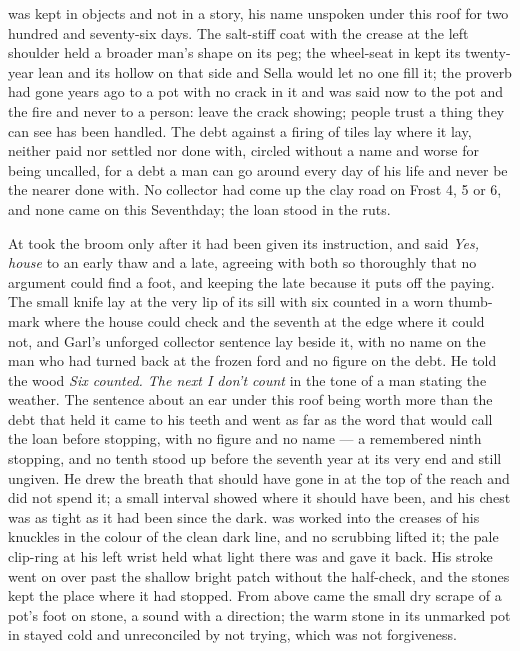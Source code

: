  was kept in objects and not in a story, his name unspoken under this roof for two hundred and seventy-six days. The salt-stiff coat with the crease at the left shoulder held a broader man's shape on its peg; the wheel-seat in  kept its twenty-year lean and its hollow on that side and Sella would let no one fill it; the proverb had gone years ago to a pot with no crack in it and was said now to the pot and the fire and never to a person: leave the crack showing; people trust a thing they can see has been handled. The debt against a firing of tiles lay where it lay, neither paid nor settled nor done with, circled without a name and worse for being uncalled, for a debt a man can go around every day of his life and never be the nearer done with. No collector had come up the clay road on Frost 4, 5 or 6, and none came on this Seventhday; the loan stood in the ruts.

\scenebreak

At   took the broom only after it had been given its instruction, and said \emph{Yes, house} to an early thaw and a late, agreeing with both so thoroughly that no argument could find a foot, and keeping the late because it puts off the paying. The small knife lay at the very lip of its sill with six counted in a worn thumb-mark where the house could check and the seventh at the edge where it could not, and Garl's unforged collector sentence lay beside it, with no name on the man who had turned back at the frozen ford and no figure on the debt. He told the wood \emph{Six counted. The next I don't count} in the tone of a man stating the weather. The sentence about an ear under this roof being worth more than the debt that held it came to his teeth and went as far as the word that would call the loan before stopping, with no figure and no name --- a remembered ninth stopping, and no tenth stood up before the seventh year at its very end and still ungiven. He drew the breath that should have gone in at the top of the reach and did not spend it; a small interval showed where it should have been, and his chest was as tight as it had been since the dark.  was worked into the creases of his knuckles in the colour of the clean dark line, and no scrubbing lifted it; the pale clip-ring at his left wrist held what light there was and gave it back. His stroke went on over  past the shallow bright patch without the half-check, and the stones kept the place where it had stopped. From above came the small dry scrape of a pot's foot on stone, a sound with a direction; the warm stone in its unmarked pot in  stayed cold and unreconciled by not trying, which was not forgiveness.


